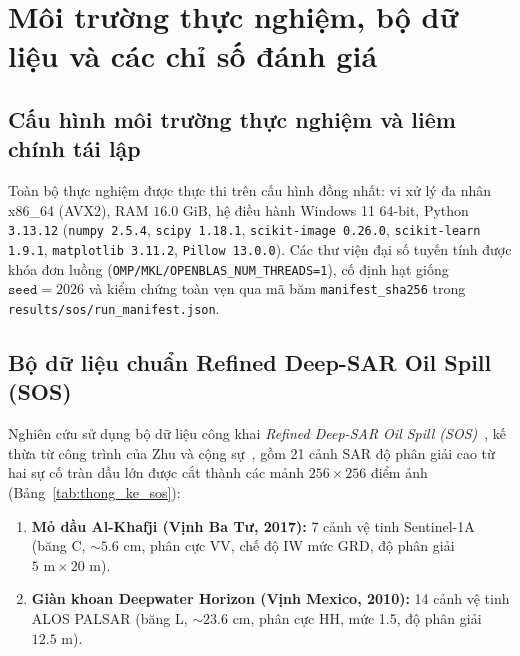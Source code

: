 \section{Môi trường thực nghiệm, bộ dữ liệu và các chỉ số đánh giá}
\label{sec:moi_truong_du_lieu_chi_so}

\subsection{Cấu hình môi trường thực nghiệm và liêm chính tái lập}

Toàn bộ thực nghiệm được thực thi trên cấu hình đồng nhất: vi xử lý đa nhân x86\_64 (AVX2), RAM $16.0\text{ GiB}$, hệ điều hành Windows 11 64-bit, Python \texttt{3.13.12} (\texttt{numpy 2.5.4}, \texttt{scipy 1.18.1}, \texttt{scikit-image 0.26.0}, \texttt{scikit-learn 1.9.1}, \texttt{matplotlib 3.11.2}, \texttt{Pillow 13.0.0}). Các thư viện đại số tuyến tính được khóa đơn luồng (\texttt{OMP/MKL/OPENBLAS\_NUM\_THREADS=1}), cố định hạt giống $\texttt{seed} = 2026$ và kiểm chứng toàn vẹn qua mã băm \texttt{manifest\_sha256} trong \texttt{results/sos/run\_manifest.json}.

\subsection{Bộ dữ liệu chuẩn Refined Deep-SAR Oil Spill (SOS)}

Nghiên cứu sử dụng bộ dữ liệu công khai \textit{Refined Deep-SAR Oil Spill (SOS)}~\cite{zuenko2025refined}, kế thừa từ công trình của Zhu và cộng sự~\cite{zhu2022oil}, gồm 21 cảnh SAR độ phân giải cao từ hai sự cố tràn dầu lớn được cắt thành các mảnh $256 \times 256$ điểm ảnh (Bảng~\ref{tab:thong_ke_sos}):
\begin{enumerate}
    \item \textbf{Mỏ dầu Al-Khafji (Vịnh Ba Tư, 2017):} 7 cảnh vệ tinh Sentinel-1A (băng C, $\sim 5.6\text{ cm}$, phân cực VV, chế độ IW mức GRD, độ phân giải $5\text{ m} \times 20\text{ m}$).
    \item \textbf{Giàn khoan Deepwater Horizon (Vịnh Mexico, 2010):} 14 cảnh vệ tinh ALOS PALSAR (băng L, $\sim 23.6\text{ cm}$, phân cực HH, mức 1.5, độ phân giải $12.5\text{ m}$).
\end{enumerate}


